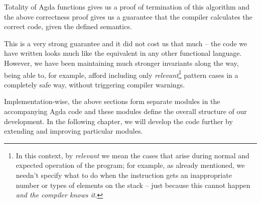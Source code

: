 Totality of Agda functions gives us a proof of termination of this algorithm and
the above correctness proof gives us a guarantee that the compiler calculates
the correct code, given the defined semantics.

This is a very strong guarantee and it did not cost us that much -- the code we
have written looks much like the equivalent in any other functional language.
However, we have been maintaining much stronger invariants along the way, being
able to, for example, afford including only \emph{relevant}\footnote{In this
  context, by \emph{relevant} we mean the cases that arise during normal and
  expected operation of the program; for example, as already mentioned, we
needn't specify what to do when the instruction  gets an
inappropriate number or types of elements on the stack -- just because this
cannot happen \emph{and the compiler knows it}.} pattern cases in a completely
safe way, without triggering compiler warnings.

Implementation-wise, the above sections form separate modules in the
accompanying Agda code and these modules define the overall structure of our
development. In the following chapter, we will develop
the code further by extending and improving particular modules.


